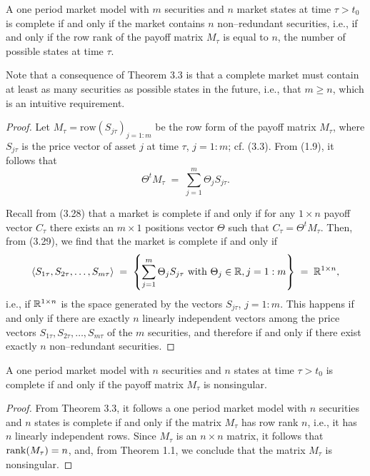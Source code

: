 \begin{theorem}
A one period market model with $m$ securities and $n$ market states at time
$\tau > t_0$ is complete if and only if the market contains $n$
non--redundant securities, i.e., if and only if the row rank of the payoff
matrix $M_\tau$ is equal to $n$, the number of possible states at time
$\tau$.
\end{theorem}

Note that a consequence of Theorem 3.3 is that a complete market must
contain at least as many securities as possible states in the future, i.e.,
that $m \geq n$, which is an intuitive requirement.

\begin{proof}
Let $M_\tau = \mathrm{row}(S_{j\tau})_{j=1:m}$ be the row form of the
payoff matrix $M_\tau$, where $S_{j\tau}$ is the price vector of asset $j$
at time $\tau$, $j = 1:m$; cf. (3.3). From (1.9), it follows that
\begin{equation}
\Theta^t M_\tau \;=\; \sum_{j=1}^m \Theta_j S_{j\tau}.
\end{equation}

Recall from (3.28) that a market is complete if and only if for any $1
\times n$ payoff vector $C_\tau$ there exists an $m \times 1$ positions
vector $\Theta$ such that $C_\tau = \Theta^t M_\tau$. Then, from (3.29), we
find that the market is complete if and only if
\[
\left\langle S_{1\tau}, S_{2\tau}, \ldots, S_{m\tau} \right\rangle
\;=\;
\left\{ \sum_{j=1}^m \Theta_j S_{j\tau} \ \text{with}\ \Theta_j \in \mathbb{R}, j =
1:m \right\}
\;=\;
\mathbb{R}^{1 \times n},
\]
i.e., if $\mathbb{R}^{1 \times n}$ is the space generated by the vectors
$S_{j\tau}$, $j = 1:m$. This happens if and only if there are exactly $n$
linearly independent vectors among the price vectors $S_{1\tau}, S_{2\tau},
\ldots, S_{m\tau}$ of the $m$ securities, and therefore if and only if
there exist exactly $n$ non--redundant securities.
\end{proof}

\begin{lemma}
A one period market model with $n$ securities and $n$ states at time $\tau
> t_0$ is complete if and only if the payoff matrix $M_\tau$ is
nonsingular.
\end{lemma}

\begin{proof}
From Theorem 3.3, it follows a one period market model with $n$ securities
and $n$ states is complete if and only if the matrix $M_\tau$ has row rank
$n$, i.e., it has $n$ linearly independent rows. Since $M_\tau$ is an $n
\times n$ matrix, it follows that $\operatorname{rank}(M_\tau) = n$, and, from Theorem
1.1, we conclude that the matrix $M_\tau$ is nonsingular.
\end{proof}

